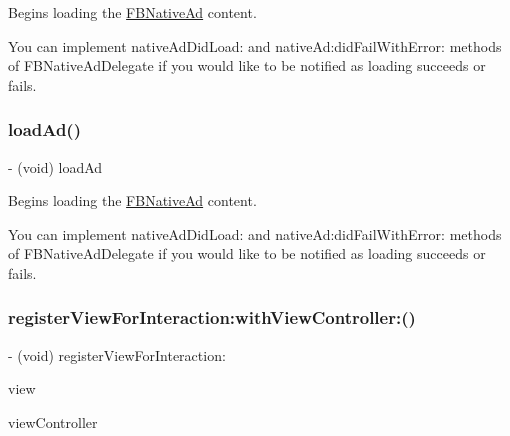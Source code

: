 Begins loading the \hyperlink{interfaceFBNativeAd}{F\+B\+Native\+Ad} content.

You can implement {\ttfamily native\+Ad\+Did\+Load\+:} and {\ttfamily native\+Ad\+:did\+Fail\+With\+Error\+:} methods of {\ttfamily F\+B\+Native\+Ad\+Delegate} if you would like to be notified as loading succeeds or fails. \mbox{\label{interfaceFBNativeAd_a943433e6b6c4e4a3d3868203642cda15}} 
\subsubsection{\texorpdfstring{load\+Ad()}{loadAd()}\hspace{0.1cm}{\footnotesize\ttfamily [5/5]}}
{\footnotesize\ttfamily -\/ (void) load\+Ad \begin{DoxyParamCaption}{ }\end{DoxyParamCaption}}

Begins loading the \hyperlink{interfaceFBNativeAd}{F\+B\+Native\+Ad} content.

You can implement {\ttfamily native\+Ad\+Did\+Load\+:} and {\ttfamily native\+Ad\+:did\+Fail\+With\+Error\+:} methods of {\ttfamily F\+B\+Native\+Ad\+Delegate} if you would like to be notified as loading succeeds or fails. \mbox{\label{interfaceFBNativeAd_af14f3514ad32a7b1b73ee6e94c1bba16}} 
\subsubsection{\texorpdfstring{register\+View\+For\+Interaction\+:with\+View\+Controller\+:()}{registerViewForInteraction:withViewController:()}\hspace{0.1cm}{\footnotesize\ttfamily [1/5]}}
{\footnotesize\ttfamily -\/ (void) register\+View\+For\+Interaction\+: \begin{DoxyParamCaption}\item[{(U\+I\+View $\ast$)}]{view }\item[{withViewController:(U\+I\+View\+Controller $\ast$)}]{view\+Controller }\end{DoxyParamCaption}}

